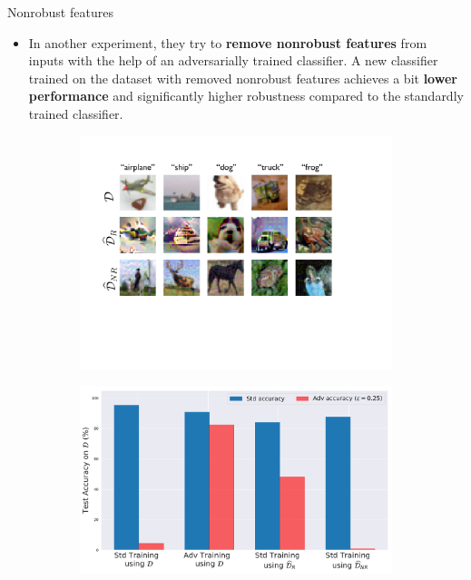 \documentclass{beamer}
\newcommand{\citep}[1]{{\color{citecolor}\relscale{0.8}[\textcite{#1}]}}
\begin{document}
\begin{frame}[allowframebreaks=0.9]{Nonrobust features}
\begin{itemize}
		\item In another experiment, they try to \textbf{remove nonrobust features} from inputs with the help of an adversarially trained classifier. A new classifier trained on the dataset with removed nonrobust features achieves a bit \textbf{lower performance} and significantly higher robustness compared to the standardly trained classifier.
	\end{itemize}
	\begin{figure}
		\centering
		\begin{subfigure}[b]{0.49\textwidth}
			\centering
			\includegraphics[width=1.0\textwidth]{figures/adversarial-examples/ilyas/cifar_datasets.pdf}
			\caption{}
			\label{fig:robust_inputs}
		\end{subfigure}
		\hfill
		\begin{subfigure}[b]{0.49\textwidth}
			\centering
			\includegraphics[width=\textwidth]{figures/adversarial-examples/ilyas/CIFAR_res.pdf}

\end{subfigure}
\end{figure}
\end{frame}
\end{document}
